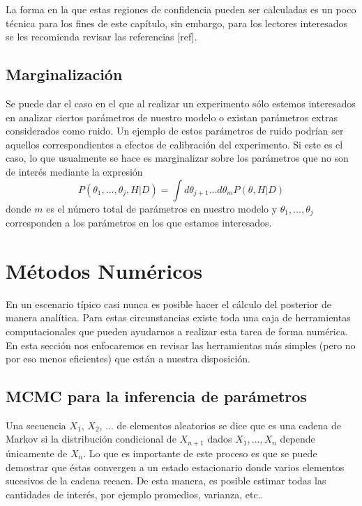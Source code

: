 \documentclass[10.5pt,prb,
               showpacs,            %
               preprintnumbers,     %
               aps,                 %
               prl,          	    %
               letterpaper,             %
               superscriptaddress,      %
               nofootinbib,         %
               tightenlines,        %
               floats,floatfix      %
               ,usenatbib]{revtex4-1}%
\begin{document}
\noindent
La forma en la que estas regiones de confidencia pueden ser calculadas es un poco t\'ecnica para los 
fines de este cap\'itulo, sin embargo, para los lectores interesados se les recomienda revisar las referencias [ref].

\subsection{Marginalizaci\'on}

Se puede dar el caso en el que al realizar un experimento s\'olo estemos interesados en analizar ciertos 
par\'ametros de nuestro modelo o existan par\'ametros extras considerados como ruido. Un ejemplo de 
estos par\'ametros de ruido podr\'ian ser aquellos correspondientes a efectos de calibraci\'on del experimento. 
Si este es el caso, lo que usualmente se hace es marginalizar sobre los par\'ametros que no son de inter\'es 
mediante la expresi\'on
%
	\begin{equation}
		P(\theta_1,...,\theta_j,H|D)=\int d\theta_{j+1}...d\theta_{m}P(\theta,H|D)
	\end{equation}
donde $m$ es el n\'umero total de par\'ametros en nuestro modelo y $\theta_1,...,\theta_j$ 
corresponden a los par\'ametros en los que estamos interesados.

\section{M\'etodos Num\'ericos}

En un escenario t\'ipico casi nunca es posible hacer el c\'alculo del posterior de manera anal\'itica. 
Para estas circunstancias existe toda una caja de herramientas computacionales que pueden 
ayudarnos a realizar esta tarea de forma num\'erica. En esta secci\'on nos enfocaremos en revisar 
las herramientas m\'as simples (pero no por eso menos eficientes) que est\'an a nuestra disposici\'on.

\subsection{MCMC para la inferencia de par\'ametros}

Una secuencia $X_1$, $X_2$, ... de elementos aleatorios se dice que es una cadena de Markov 
si la distribuci\'on condicional de $X_{n+1}$ dados $X_1,...,X_n$ depende \'unicamente de $X_n$. 
Lo que es importante de este proceso es que se puede demostrar que \'estas convergen a un estado 
estacionario donde varios elementos sucesivos de la cadena recaen. De esta manera, es posible estimar 
todas las cantidades de inter\'es, por ejemplo promedios, varianza, etc.. 
\end{document}
